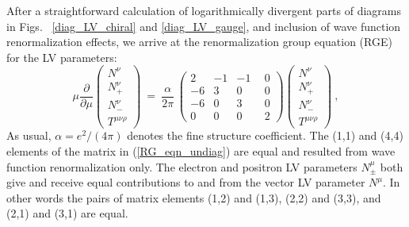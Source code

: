 \documentclass[12pt]{revtex4}
\begin{document}
After a straightforward calculation of logarithmically divergent parts
of diagrams in Figs. ~\ref{diag_LV_chiral} and \ref{diag_LV_gauge},
and inclusion of wave function renormalization effects, we arrive at
the renormalization group equation (RGE) for the LV parameters: 
\begin{equation}
\label{RG_eqn_undiag}
     \mu \frac{\partial}
              {\partial\mu} 
                \left(
\begin{array}{c}
                   N^\nu \\ 
   N_+^\nu \\
                   N_{-}^\nu \\
   T^{\mu\nu\rho}
                \end{array} \right) ~=~  
     \frac{\alpha}
          {2 \pi} \, 
     \left(\begin{array}{rrrr}
                    2 & -1 & -1 & ~~0 \\
   -6 &  3 &  0 & ~~0 \\
                   -6 &  0 &  3 & ~~0 \\
    0 &  0 &  0 & ~~2
           \end{array}\right)
     \left(
  \begin{array}{c}
                 N^\nu \\ 
 N_+^\nu \\
                 N_{-}^\nu \\
 T^{\mu\nu\rho}
          \end{array} \right)~,
\end{equation}
%
As usual, $\alpha = e^2/(4\pi)$ denotes the fine structure coefficient. 
The (1,1) and (4,4) elements of the matrix in (\ref{RG_eqn_undiag})
are equal and  resulted from wave function renormalization only.
The electron and positron LV parameters $N_\pm^\mu$ both give and
receive equal contributions to and from the vector LV parameter
$N^\mu$. In other words the pairs of matrix elements (1,2) and (1,3),
(2,2) and (3,3), and (2,1) and (3,1) are equal.  
\end{document}

